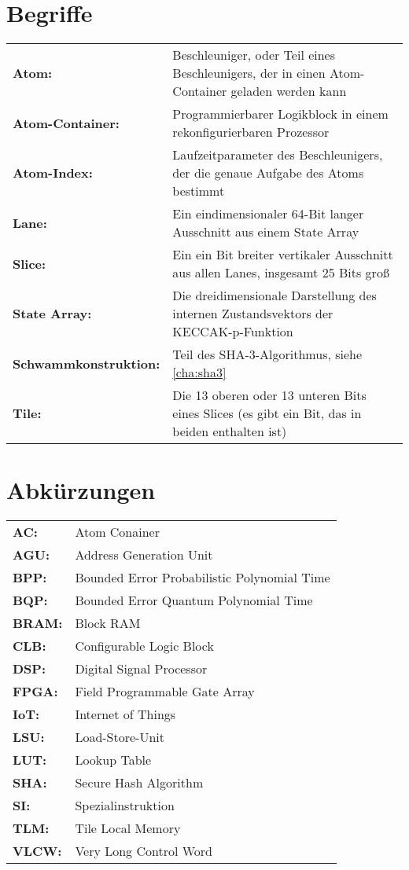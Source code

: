 \section{Begriffe}
\begin{tabularx}{\linewidth}{@{}>{\bfseries}l@{\hspace{.5em}}X@{}}
	Atom: & Beschleuniger, oder Teil eines Beschleunigers, der in einen Atom-Container geladen werden kann \\
	Atom-Container: & Programmierbarer Logikblock in einem rekonfigurierbaren Prozessor \\
	Atom-Index: & Laufzeitparameter des Beschleunigers, der die genaue Aufgabe des Atoms bestimmt \\
	Lane: & Ein eindimensionaler 64-Bit langer Ausschnitt aus einem State Array \\
	Slice: & Ein ein Bit breiter vertikaler Ausschnitt aus allen Lanes, insgesamt 25 Bits groß \\
	State Array: & Die dreidimensionale Darstellung des internen Zustandsvektors der KECCAK-p-Funktion \\
	Schwammkonstruktion: & Teil des SHA-3-Algorithmus, siehe \ref{cha:sha3} \\
	Tile: & Die 13 oberen oder 13 unteren Bits eines Slices (es gibt ein Bit, das in beiden enthalten ist)
\end{tabularx}
\newpage
\section{Abkürzungen}
\begin{tabularx}{\linewidth}{@{}>{\bfseries}l@{\hspace{.5em}}X@{}}
	AC: & Atom Conainer \\
	AGU: & Address Generation Unit \\
	BPP: & Bounded Error Probabilistic Polynomial Time \\
	BQP: & Bounded Error Quantum Polynomial Time \\
	BRAM: & Block RAM \\
	CLB: & Configurable Logic Block \\
	DSP: & Digital Signal Processor \\
	FPGA: & Field Programmable Gate Array \\
	IoT: & Internet of Things \\
	LSU: & Load-Store-Unit \\
	LUT: & Lookup Table \\
	SHA: & Secure Hash Algorithm \\
	SI: & Spezialinstruktion \\
	TLM: & Tile Local Memory \\
	VLCW: & Very Long Control Word
\end{tabularx}